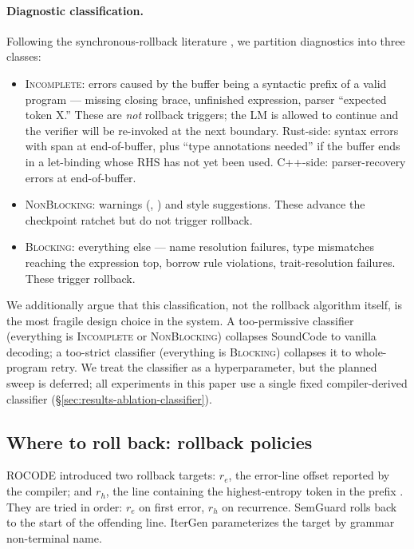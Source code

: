 \paragraph{Diagnostic classification.}
Following the synchronous-rollback literature
\citep{jiang2024rocode,wang2025semguard}, we partition diagnostics
into three classes:
\begin{itemize}[itemsep=2pt,topsep=2pt]
\item \textsc{Incomplete}: errors caused by the buffer being a
  syntactic prefix of a valid program --- missing closing brace,
  unfinished expression, parser ``expected token X.'' These are
  \emph{not} rollback triggers; the LM is allowed to continue and
  the verifier will be re-invoked at the next boundary. Rust-side:
  syntax errors with span at end-of-buffer, plus 
  ``type annotations needed'' if the buffer ends in a let-binding
  whose RHS has not yet been used. C++-side: parser-recovery
  errors at end-of-buffer.
\item \textsc{NonBlocking}: warnings (,
  ) and style suggestions. These advance the
  checkpoint ratchet but do not trigger rollback.
\item \textsc{Blocking}: everything else --- name resolution
  failures, type mismatches reaching the expression top, borrow
  rule violations, trait-resolution failures. These trigger
  rollback.
\end{itemize}

We additionally argue that this classification, not the rollback
algorithm itself, is the most fragile design choice in the system.
A too-permissive classifier (everything is \textsc{Incomplete} or
\textsc{NonBlocking}) collapses SoundCode to vanilla decoding; a
too-strict classifier (everything is \textsc{Blocking}) collapses it
to whole-program retry. We treat the classifier as a
hyperparameter, but the planned sweep is deferred; all experiments
in this paper use a single fixed compiler-derived classifier
(\S\ref{sec:results-ablation-classifier}).

\subsection{Where to roll back: rollback policies}\label{sec:where-rollback}

ROCODE \citep{jiang2024rocode} introduced two rollback targets:
$r_e$, the error-line offset reported by the compiler; and $r_h$,
the line containing the highest-entropy token in the prefix
\citep[Eqs.~5--7]{jiang2024rocode}. They are tried in order: $r_e$
on first error, $r_h$ on recurrence. SemGuard
\citep{wang2025semguard} rolls back to the start of the offending
line. IterGen \citep{ugare2025itergen} parameterizes the target by
grammar non-terminal name.

